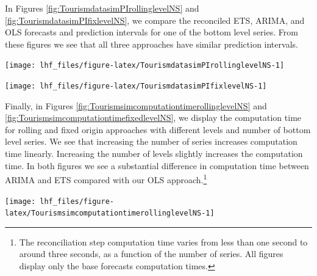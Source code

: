 \documentclass[11pt,a4paper,]{article}
\let\origfigure\figure
\let\endorigfigure\endfigure
\renewenvironment{figure}[1][2] {
    \expandafter\origfigure\expandafter[!htbp]
} {
    \endorigfigure
}
\begin{document}
In Figures \ref{fig:TourismdatasimPIrollinglevelNS} and \ref{fig:TourismdatasimPIfixlevelNS}, we compare the reconciled ETS, ARIMA, and OLS forecasts and prediction intervals for one of the bottom level series. From these figures we see that all three approaches have similar prediction intervals.

\begin{figure}

{\centering \texttt{[image: lhf\_files/figure-latex/TourismdatasimPIrollinglevelNS-1]} 

}

\caption{Comparing reconciled 'rolling origin' forecasts and prediction intervals for a sample bottom-level series, for different number of bottom-level series and hierarchy levels (different panels). Simulated series has error value 0.5 and 24 months test set.}\label{fig:TourismdatasimPIrollinglevelNS}
\end{figure}

\begin{figure}

{\centering \texttt{[image: lhf\_files/figure-latex/TourismdatasimPIfixlevelNS-1]} 

}

\caption{Comparing reconciled fixed origin forecasts and prediction intervals for a sample bottom-level series, for different number of bottom-level series and hierarchy levels (different panels). Simulated series has error value 0.5 and 24 months test set.}\label{fig:TourismdatasimPIfixlevelNS}
\end{figure}

Finally, in Figures \ref{fig:TourismsimcomputationtimerollinglevelNS} and \ref{fig:TourismsimcomputationtimefixedlevelNS}, we display the computation time for rolling and fixed origin approaches with different levels and number of bottom level series. We see that increasing the number of series increases computation time linearly. Increasing the number of levels slightly increases the computation time. In both figures we see a substantial difference in computation time between ARIMA and ETS compared with our OLS approach.\footnote{The reconciliation step computation time varies from less than one second to around three seconds, as a function of the number of series. All figures display only the base forecasts computation times.}

\begin{figure}

{\centering \texttt{[image: lhf\_files/figure-latex/TourismsimcomputationtimerollinglevelNS-1]} 

}

\caption{Computation time (seconds) for rolling origin reconciled forecasts using ETS, ARIMA and OLS, by number of bottom-level series (x-axis), and by levels of hierarchy (panels). Simulated series has error value 0.5 and 24 months test set.}\label{fig:TourismsimcomputationtimerollinglevelNS}
\end{figure}
\end{document}
